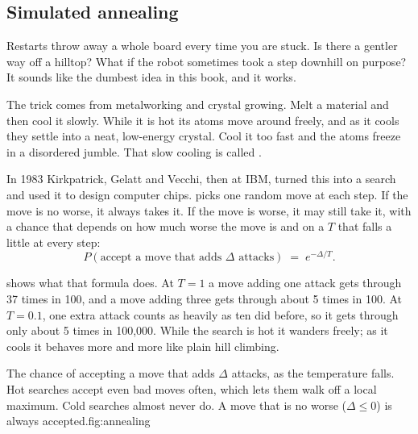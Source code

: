 \subsection{Simulated annealing}

Restarts throw away a whole board every time you are stuck. Is there a gentler way off a hilltop? What if the robot sometimes took a step downhill on purpose? It sounds like the dumbest idea in this book, and it works.

\begin{analogy}
The trick comes from metalworking and crystal growing. Melt a material and then cool it slowly. While it is hot its atoms move around freely, and as it cools they settle into a neat, low-energy crystal. Cool it too fast and the atoms freeze in a disordered jumble. That slow cooling is called .
\end{analogy}

In 1983 Kirkpatrick, Gelatt and Vecchi, then at IBM, turned this into a search and used it to design computer chips.  picks one random move at each step. If the move is no worse, it always takes it. If the move is worse, it may still take it, with a chance that depends on how much worse the move is and on a  $T$ that falls a little at every step:
\[
P(\text{accept a move that adds } \Delta \text{ attacks}) \;=\; e^{-\Delta/T}.
\]

 shows what that formula does. At $T=1$ a move adding one attack gets through 37 times in 100, and a move adding three gets through about 5 times in 100. At $T=0.1$, one extra attack counts as heavily as ten did before, so it gets through only about 5 times in 100,000. While the search is hot it wanders freely; as it cools it behaves more and more like plain hill climbing.

\begin{utpfig}{The chance of accepting a move that adds $\Delta$ attacks, as the temperature falls. Hot searches accept even bad moves often, which lets them walk off a local maximum. Cold searches almost never do. A move that is no worse ($\Delta\le0$) is always accepted.}{fig:annealing}
\end{utpfig}

